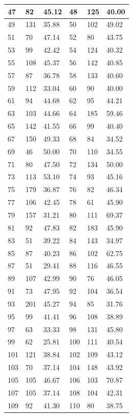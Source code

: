 \documentclass[10.9pt]{article} %
\begin{document}
{\begin{longtable}{|p{2cm}|p{2cm}|p{2cm}|p{2cm}|p{2cm}|p{2cm}|}
\hline
47 & 82& 45.12 & 48 & 125& 40.00\\
\hline
49 & 131& 35.88 & 50 & 102& 49.02\\
\hline
51 & 70& 47.14 & 52 & 80& 43.75\\
\hline
53 & 99& 42.42 & 54 & 124& 40.32\\
\hline
55 & 108& 45.37 & 56 & 142& 40.85\\
\hline
57 & 87& 36.78 & 58 & 133& 40.60\\
\hline
59 & 112& 33.04 & 60 & 90& 40.00\\
\hline
61 & 94& 44.68 & 62 & 95& 44.21\\
\hline
63 & 103& 44.66 & 64 & 185& 59.46\\
\hline
65 & 142& 41.55 & 66 & 99& 40.40\\
\hline
67 & 150& 49.33 & 68 & 84& 34.52\\
\hline
69 & 46& 50.00 & 70 & 110& 34.55\\
\hline
71 & 80& 47.50 & 72 & 134& 50.00\\
\hline
73 & 113& 53.10 & 74 & 93& 45.16\\
\hline
75 & 179& 36.87 & 76 & 82& 46.34\\
\hline
77 & 106& 42.45 & 78 & 61& 45.90\\
\hline
79 & 157& 31.21 & 80 & 111& 69.37\\
\hline
81 & 92& 47.83 & 82 & 183& 45.90\\
\hline
83 & 51& 39.22 & 84 & 143& 34.97\\
\hline
85 & 87& 40.23 & 86 & 102& 62.75\\
\hline
87 & 51& 29.41 & 88 & 116& 46.55\\
\hline
89 & 107& 42.99 & 90 & 76& 46.05\\
\hline
91 & 73& 47.95 & 92 & 104& 36.54\\
\hline
93 & 201& 45.27 & 94 & 85& 31.76\\
\hline
95 & 99& 41.41 & 96 & 108& 38.89\\
\hline
97 & 63& 33.33 & 98 & 131& 45.80\\
\hline
99 & 62& 25.81 & 100 & 111& 40.54\\
\hline
101 & 121& 38.84 & 102 & 109& 43.12\\
\hline
103 & 70& 37.14 & 104 & 148& 43.92\\
\hline
105 & 105& 46.67 & 106 & 103& 70.87\\
\hline
107 & 105& 37.14 & 108 & 104& 42.31\\
\hline
109 & 92& 41.30 & 110 & 80& 38.75\\

\end{longtable}}
\end{document}
